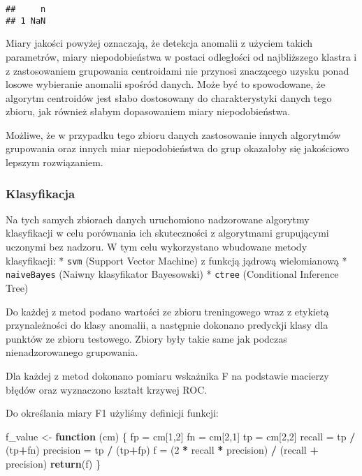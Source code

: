 \documentclass[
]{article}
\newenvironment{Shaded}{\begin{snugshade}}{\end{snugshade}}
\newcommand{\ControlFlowTok}[1]{\textcolor[rgb]{0.13,0.29,0.53}{\textbf{#1}}}
\newcommand{\DecValTok}[1]{\textcolor[rgb]{0.00,0.00,0.81}{#1}}
\newcommand{\KeywordTok}[1]{\textcolor[rgb]{0.13,0.29,0.53}{\textbf{#1}}}
\newcommand{\NormalTok}[1]{#1}
\newcommand{\OperatorTok}[1]{\textcolor[rgb]{0.81,0.36,0.00}{\textbf{#1}}}
\newcommand{\StringTok}[1]{\textcolor[rgb]{0.31,0.60,0.02}{#1}}
\begin{document}
\begin{verbatim}
##     n
## 1 NaN
\end{verbatim}

Miary jakości powyżej oznaczają, że detekcja anomalii z użyciem takich
parametrów, miary niepodobieństwa w postaci odległości od najbliższego
klastra i z zastosowaniem grupowania centroidami nie przynosi znaczącego
uzysku ponad losowe wybieranie anomalii spośród danych. Może być to
spowodowane, że algorytm centroidów jest słabo dostosowany do
charakterystyki danych tego zbioru, jak również słabym dopasowaniem
miary niepodobieństwa.

Możliwe, że w przypadku tego zbioru danych zastosowanie innych
algorytmów grupowania oraz innych miar niepodobieństwa do grup okazałoby
się jakościowo lepszym rozwiązaniem.

\hypertarget{klasyfikacja}{%
\subsubsection{Klasyfikacja}\label{klasyfikacja}}

Na tych samych zbiorach danych uruchomiono nadzorowane algorytmy
klasyfikacji w celu porównania ich skuteczności z algorytmami
grupującymi uczonymi bez nadzoru. W tym celu wykorzystano wbudowane
metody klasyfikacji: * \texttt{svm} (Support Vector Machine) z funkcją
jądrową wielomianową * \texttt{naiveBayes} (Naiwny klasyfikator
Bayesowski) * \texttt{ctree} (Conditional Inference Tree)

Do każdej z metod podano wartości ze zbioru treningowego wraz z etykietą
przynależności do klasy anomalii, a następnie dokonano predyckji klasy
dla punktów ze zbioru testowego. Zbiory były takie same jak podczas
nienadzorowanego grupowania.

Dla każdej z metod dokonano pomiaru wskażnika F na podstawie macierzy
błędów oraz wyznaczono kształt krzywej ROC.

Do określania miary F1 użyliśmy definicji funkcji:

\begin{Shaded}
\begin{Highlighting}[]
\NormalTok{f_value <-}\StringTok{ }\ControlFlowTok{function}\NormalTok{ (cm) \{}
\NormalTok{  fp =}\StringTok{ }\NormalTok{cm[}\DecValTok{1}\NormalTok{,}\DecValTok{2}\NormalTok{]}
\NormalTok{  fn =}\StringTok{ }\NormalTok{cm[}\DecValTok{2}\NormalTok{,}\DecValTok{1}\NormalTok{]}
\NormalTok{  tp =}\StringTok{ }\NormalTok{cm[}\DecValTok{2}\NormalTok{,}\DecValTok{2}\NormalTok{]}
\NormalTok{  recall =}\StringTok{ }\NormalTok{tp }\OperatorTok{/}\StringTok{ }\NormalTok{(tp}\OperatorTok{+}\NormalTok{fn)}
\NormalTok{  precision =}\StringTok{ }\NormalTok{tp }\OperatorTok{/}\StringTok{ }\NormalTok{(tp}\OperatorTok{+}\NormalTok{fp)}
\NormalTok{  f =}\StringTok{ }\NormalTok{(}\DecValTok{2} \OperatorTok{*}\StringTok{ }\NormalTok{recall }\OperatorTok{*}\StringTok{ }\NormalTok{precision) }\OperatorTok{/}\StringTok{ }\NormalTok{(recall }\OperatorTok{+}\StringTok{ }\NormalTok{precision)}
  \KeywordTok{return}\NormalTok{(f)}
\NormalTok{\}}
\end{Highlighting}
\end{Shaded}
\end{document}
